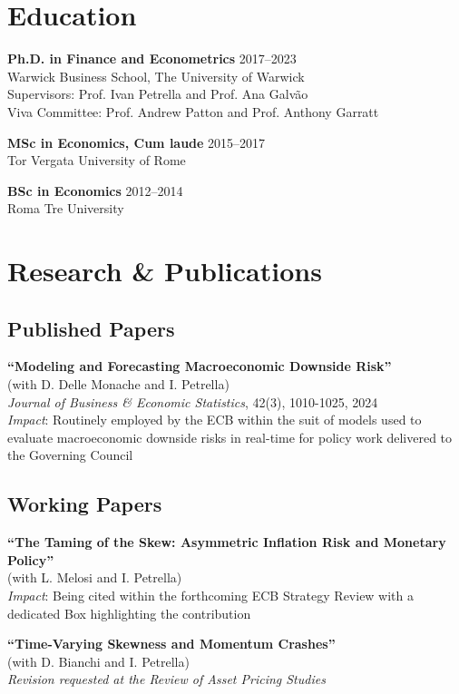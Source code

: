 \documentclass[11pt,a4paper]{article}
\begin{document}
\section{Education}

\noindent\textbf{Ph.D. in Finance and Econometrics} \hfill 2017--2023\\
Warwick Business School, The University of Warwick\\
Supervisors: Prof. Ivan Petrella and Prof. Ana Galvão\\
Viva Committee: Prof. Andrew Patton and Prof. Anthony Garratt

\noindent\textbf{MSc in Economics, Cum laude} \hfill 2015--2017\\
Tor Vergata University of Rome

\noindent\textbf{BSc in Economics} \hfill 2012--2014\\
Roma Tre University

\section{Research \& Publications}

\subsection{Published Papers}

\noindent\textbf{``Modeling and Forecasting Macroeconomic Downside Risk''} \\(with D. Delle Monache and I. Petrella)\\
\textit{Journal of Business \& Economic Statistics}, 42(3), 1010-1025, 2024\\
\textit{Impact}: Routinely employed by the ECB within the suit of models used to evaluate macroeconomic downside risks in real-time for policy work delivered to the Governing Council

\subsection{Working Papers}

\noindent\textbf{``The Taming of the Skew: Asymmetric Inflation Risk and Monetary Policy''} \\(with L. Melosi and I. Petrella)\\
\textit{Impact}: Being cited within the forthcoming ECB Strategy Review with a dedicated Box highlighting the contribution

\noindent\textbf{``Time-Varying Skewness and Momentum Crashes''} \\(with D. Bianchi and I. Petrella)\\
\textit{Revision requested at the Review of Asset Pricing Studies}
\end{document}
